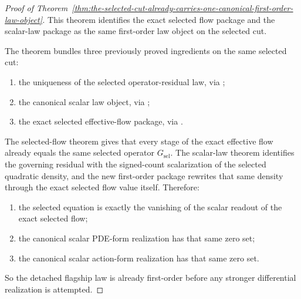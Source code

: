 \begin{proof}[Proof of Theorem~\ref{thm:the-selected-cut-already-carries-one-canonical-first-order-law-object}]
\label{proof:thm:the-selected-cut-already-carries-one-canonical-first-order-law-object}
This theorem identifies the exact selected flow package and the scalar-law
package as the same first-order law object on the selected cut.

The theorem bundles three previously proved ingredients on the same selected
cut:
\begin{enumerate}
\item the uniqueness of the selected operator-residual law, via
      ;
\item the canonical scalar law object, via
      ;
\item the exact selected effective-flow package, via
      .
\end{enumerate}

The selected-flow theorem gives that every stage of the exact effective flow
already equals the same selected operator \(G_{\mathrm{sel}}\). The scalar-law
theorem identifies the governing residual with the signed-count scalarization
of the selected quadratic density, and the new first-order package rewrites
that same density through the exact selected flow value itself. Therefore:
\begin{enumerate}
\item the selected equation is exactly the vanishing of the scalar readout of
      the exact selected flow;
\item the canonical scalar PDE-form realization has that same zero set;
\item the canonical scalar action-form realization has that same zero set.
\end{enumerate}
So the detached flagship law is already first-order before any stronger
differential realization is attempted.
\end{proof}

